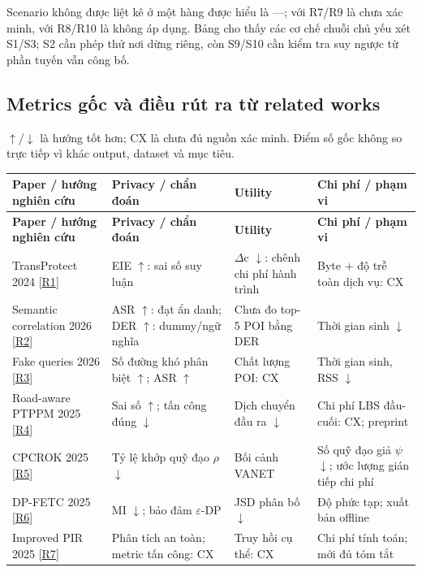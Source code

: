 \documentclass[10pt,a4paper]{article}
\begin{document}
\endgroup
Scenario không được liệt kê ở một hàng được hiểu là —; với R7/R9 là chưa xác minh, với R8/R10 là không áp dụng. Bảng cho thấy các cơ chế chuỗi chủ yếu xét S1/S3; S2 cần phép thử nơi dừng riêng, còn S9/S10 cần kiểm tra suy ngược từ phần tuyến vẫn công bố.


\clearpage
\subsection{Metrics gốc và điều rút ra từ related works}\label{sub:1.1}
$\uparrow$/$\downarrow$ là hướng tốt hơn; CX là chưa đủ nguồn xác minh. Điểm số gốc không so trực tiếp vì khác output, dataset và mục tiêu.

\begingroup\small
\begin{longtable}{@{}P{3.871cm}P{4.355cm}P{3.871cm}P{4.258cm}@{}}
\toprule
\textbf{Paper / hướng nghiên cứu} & \textbf{Privacy / chẩn đoán} & \textbf{Utility} & \textbf{Chi phí / phạm vi}\\\midrule
\endfirsthead
\toprule
\textbf{Paper / hướng nghiên cứu} & \textbf{Privacy / chẩn đoán} & \textbf{Utility} & \textbf{Chi phí / phạm vi}\\\midrule
\endhead
\bottomrule\endfoot
TransProtect 2024 [\hyperlink{ref-R1}{R1}] & EIE $\uparrow$: sai số suy luận & $\Delta$c $\downarrow$: chênh chi phí hành trình & Byte + độ trễ toàn dịch vụ: CX\\
\addlinespace[3pt]
Semantic correlation 2026 [\hyperlink{ref-R2}{R2}] & ASR $\uparrow$: đạt ẩn danh; DER $\uparrow$: dummy/ngữ nghĩa & Chưa đo top-5 POI bằng DER & Thời gian sinh $\downarrow$\\
\addlinespace[3pt]
Fake queries 2026 [\hyperlink{ref-R3}{R3}] & Số đường khó phân biệt $\uparrow$; ASR $\uparrow$ & Chất lượng POI: CX & Thời gian sinh, RSS $\downarrow$\\
\addlinespace[3pt]
Road-aware PTPPM 2025 [\hyperlink{ref-R4}{R4}] & Sai số $\uparrow$; tấn công đúng $\downarrow$ & Dịch chuyển đầu ra $\downarrow$ & Chi phí LBS đầu-cuối: CX; preprint\\
\addlinespace[3pt]
CPCROK 2025 [\hyperlink{ref-R5}{R5}] & Tỷ lệ khớp quỹ đạo $\rho$ $\downarrow$ & Bối cảnh VANET & Số quỹ đạo giả $\psi$ $\downarrow$; ước lượng gián tiếp chi phí\\
\addlinespace[3pt]
DP-FETC 2025 [\hyperlink{ref-R6}{R6}] & MI $\downarrow$; bảo đảm $\varepsilon$-DP & JSD phân bố $\downarrow$ & Độ phức tạp; xuất bản offline\\
\addlinespace[3pt]
Improved PIR 2025 [\hyperlink{ref-R7}{R7}] & Phân tích an toàn; metric tấn công: CX & Truy hồi cụ thể: CX & Chi phí tính toán; mới đủ tóm tắt\\

\end{longtable}
\end{document}
